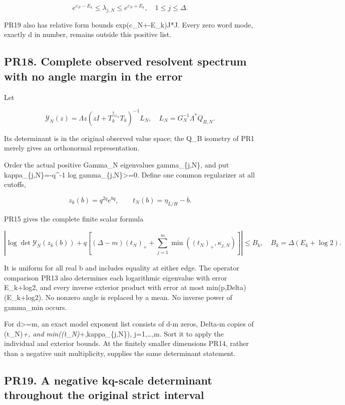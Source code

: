 \documentclass[11pt]{article}
\begin{document}
\[
e^{c_N-E_k}\le\lambda_{j,N}\le e^{c_N+E_k},\quad1\le j\le\Delta.
\tag{PR22}
\]

PR19 also has relative form bounds exp(c\_N+-E\_k)J*J. Every zero word mode, exactly d in number, remains outside this positive list.

\subsection{PR18. Complete observed resolvent spectrum with no angle margin in the error}\label{pr18.-complete-observed-resolvent-spectrum-with-no-angle-margin-in-the-error}

Let

\[
\mathscr Y_N(z)=\Lambda z(zI+T_k^{\dagger_{G_N}}T_k)^{-1}L_N,
\quad L_N=G_N^{-1}\Lambda^*Q_{B,N}.
\]

Its determinant is in the original observed value space; the Q\_B isometry of PR1 merely gives an orthonormal representation.

Order the actual positive Gamma\_N eigenvalues gamma\_\{j,N\}, and put kappa\_\{j,N\}=-q\^{}-1 log gamma\_\{j,N\}\textgreater=0. Define one common regularizer at all cutoffs,

\[
z_k(b)=q^{2q}e^{bq},\qquad t_N(b)=\eta_{L/H}-b.
\tag{PR23}
\]

PR15 gives the complete finite scalar formula

\[
\boxed{
\left|\log\det\mathscr Y_N(z_k(b))
+q\left[(\Delta-m)(t_N)_+
+\sum_{j=1}^m\min((t_N)_+,\kappa_{j,N})\right]\right|
\le B_k,\quad B_k=\Delta(E_k+\log2).
}
\tag{PR24}
\]

It is uniform for all real b and includes equality at either edge. The operator comparison PR13 also determines each logarithmic eigenvalue with error E\_k+log2, and every inverse exterior product with error at most min(p,Delta)(E\_k+log2). No nonzero angle is replaced by a mean. No inverse power of gamma\_min occurs.

For d\textgreater=m, an exact model exponent list consists of d-m zeros, Delta-m copies of (t\_N)\emph{+, and min((t\_N)}+,kappa\_\{j,N\}), j=1,\ldots,m. Sort it to apply the individual and exterior bounds. At the finitely smaller dimensions PR14, rather than a negative unit multiplicity, supplies the same determinant statement.

\subsection{PR19. A negative kq-scale determinant throughout the original strict interval}\label{pr19.-a-negative-kq-scale-determinant-throughout-the-original-strict-interval}
\end{document}
